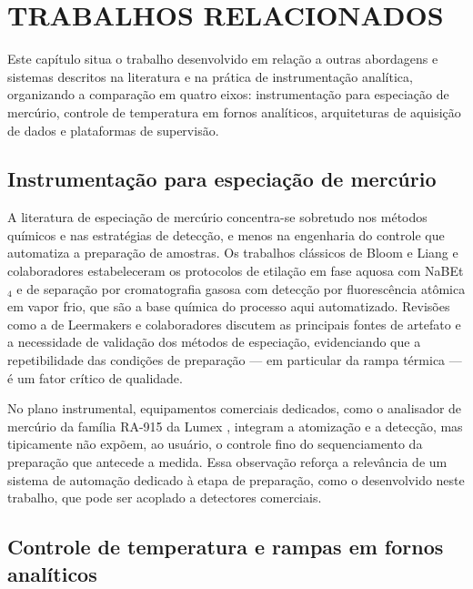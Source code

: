 \chapter{TRABALHOS RELACIONADOS}

Este capítulo situa o trabalho desenvolvido em relação a outras abordagens e
sistemas descritos na literatura e na prática de instrumentação analítica,
organizando a comparação em quatro eixos: instrumentação para especiação de
mercúrio, controle de temperatura em fornos analíticos, arquiteturas de
aquisição de dados e plataformas de supervisão.

\section{Instrumentação para especiação de mercúrio}

A literatura de especiação de mercúrio concentra-se sobretudo nos métodos
químicos e nas estratégias de detecção, e menos na engenharia do controle que
automatiza a preparação de amostras. Os trabalhos clássicos de Bloom
\cite{bloom1989} e Liang e colaboradores \cite{liang1994} estabeleceram os
protocolos de etilação em fase aquosa com NaBEt$_4$ e de separação por
cromatografia gasosa com detecção por fluorescência atômica em vapor frio, que
são a base química do processo aqui automatizado. Revisões como a de Leermakers
e colaboradores \cite{leermakers2005} discutem as principais fontes de artefato
e a necessidade de validação dos métodos de especiação, evidenciando que a
repetibilidade das condições de preparação --- em particular da rampa térmica ---
é um fator crítico de qualidade.

No plano instrumental, equipamentos comerciais dedicados, como o analisador de
mercúrio da família RA-915 da Lumex \cite{lumex}, integram a atomização e a
detecção, mas tipicamente não expõem, ao usuário, o controle fino do
sequenciamento da preparação que antecede a medida. Essa observação reforça a
relevância de um sistema de automação dedicado à etapa de preparação, como o
desenvolvido neste trabalho, que pode ser acoplado a detectores comerciais.

\section{Controle de temperatura e rampas em fornos analíticos}

